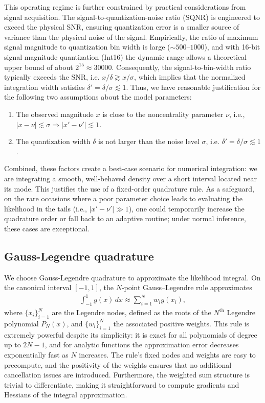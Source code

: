 \documentclass{article}
\begin{document}
This operating regime is further constrained by practical considerations from signal acquisition.
The signal-to-quantization-noise ratio (SQNR) is engineered to exceed the physical SNR, ensuring quantization error is a smaller source of variance than the physical noise of the signal.
Empirically, the ratio of maximum signal magnitude to quantization bin width is large ($\sim\!500$--$1000$), and with 16-bit signal magnitude quantization (Int16) the dynamic range allows a theoretical upper bound of about $2^{15} \approx 30000$.
Consequently, the signal-to-bin-width ratio typically exceeds the SNR, i.e. $x/\delta \gtrsim x/\sigma$, which implies that the normalized integration width satisfies $\delta' = \delta/\sigma \lesssim 1$.
Thus, we have reasonable justification for the following two assumptions about the model parameters:
%
\begin{enumerate}
  \item The observed magnitude $x$ is close to the noncentrality parameter $\nu$, i.e., $|x - \nu| \lesssim \sigma \Rightarrow |x' - \nu'| \lesssim 1$.
  \item The quantization width $\delta$ is not larger than the noise level $\sigma$, i.e. $\delta' = \delta / \sigma \lesssim 1$.
\end{enumerate}
%
Combined, these factors create a best-case scenario for numerical integration:
we are integrating a smooth, well-behaved density over a short interval located near its mode.
This justifies the use of a fixed-order quadrature rule.
As a safeguard, on the rare occasions where a poor parameter choice leads to evaluating the likelihood in the tails (i.e., $|x'-\nu'| \gg 1$), one could temporarily increase the quadrature order or fall back to an adaptive routine;
under normal inference, these cases are exceptional.

\subsection{Gauss-Legendre quadrature}

We choose Gauss-Legendre quadrature to approximate the likelihood integral.
On the canonical interval $[-1,1]$, the $N$‑point Gauss–Legendre rule approximates
%
\begin{align}
  \int_{-1}^{1} g(x) \, dx \approx \sum_{i=1}^{N} w_i g(x_i),
\end{align}
%
where $\{x_i\}_{i=1}^N$ are the Legendre nodes, defined as the roots of the $N^\text{th}$ Legendre polynomial $P_N(x)$, and $\{w_i\}_{i=1}^N$ the associated positive weights.
This rule is extremely powerful despite its simplicity:
it is exact for all polynomials of degree up to $2N-1$, and for analytic functions the approximation error decreases exponentially fast as $N$ increases.
The rule's fixed nodes and weights are easy to precompute, and the positivity of the weights ensures that no additional cancellation issues are introduced.
Furthermore, the weighted sum structure is trivial to differentiate, making it straightforward to compute gradients and Hessians of the integral approximation.
\end{document}
